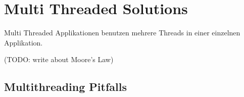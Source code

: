 \section{Multi Threaded Solutions}
\label{section: Multi Threaded Solutions}

Multi Threaded Applikationen benutzen mehrere Threads in einer einzelnen Applikation. \cite[p. 1]{DabMIT}


(TODO: write about Moore’s Law)

\subsection{Multithreading Pitfalls}
\label{subsection: multithreading pitfalls}

\cite[p. 2]{Sch97}